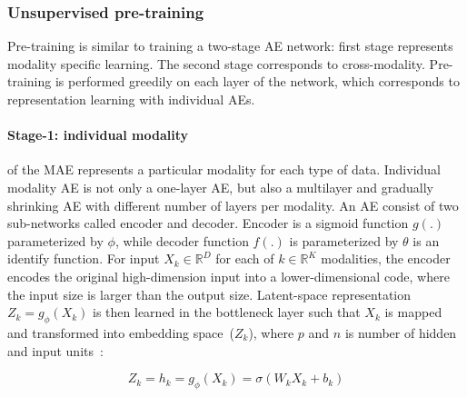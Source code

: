 \subsubsection{Unsupervised pre-training} 
Pre-training is similar to training a two-stage AE network: first stage represents modality specific learning. The second stage corresponds to cross-modality. 
Pre-training is performed greedily on each layer of the network, which corresponds to representation learning with individual AEs. 

\paragraph{Stage-1: individual modality}\noindent of the MAE represents a particular modality for each type of data. Individual modality AE is not only a one-layer AE, but also a multilayer and gradually shrinking AE with different number of layers per modality. An AE consist of two sub-networks called encoder and decoder. Encoder is a sigmoid function $g(.)$ parameterized by $\phi$, while decoder function $f(.)$ is   parameterized by $\theta$ is an identify function. For input $X_{k} \in \mathbb{R}^{D}$ for each of $k \in \mathbb{R}^K$ modalities, the encoder encodes the original high-dimension input into a lower-dimensional code, where the input size is larger than the output size. Latent-space representation $Z_k=g_{\phi}(X_{k})$ is then learned in the bottleneck layer such that $X_{k}$ is mapped and transformed into embedding space~($Z_k$), where $p$ and $n$ is number of hidden and input units~\cite{mmdcae}: 

\begin{equation}
    Z_k = h_{k}=g_\phi \left({X}_{k}\right)=\sigma\left(W_{k} X_{k}+b_{k}\right)
\end{equation}

